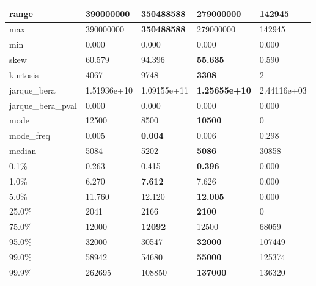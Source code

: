 \begin{table}[H]
\begin{tabular}{|l|m{10em}|m{10em}|m{10em}|m{10em}|}
\hline range & 390000000 & \bfseries 350488588 & 279000000 & \cellcolor[rgb]{0.9, 0.54, 0.52} 142945 \\
\hline max & 390000000 & \bfseries 350488588 & 279000000 & \cellcolor[rgb]{0.9, 0.54, 0.52} 142945 \\
\hline min & 0.000 & 0.000 & 0.000 & 0.000 \\
\hline skew & 60.579 & 94.396 & \bfseries 55.635 & \cellcolor[rgb]{0.9, 0.54, 0.52} 0.590 \\
\hline kurtosis & 4067 & \cellcolor[rgb]{0.9, 0.54, 0.52} 9748 & \bfseries 3308 & 2 \\
\hline jarque\_bera & 1.51936e+10 & \cellcolor[rgb]{0.9, 0.54, 0.52} 1.09155e+11 & \bfseries 1.25655e+10 & 2.44116e+03 \\
\hline jarque\_bera\_pval & 0.000 & 0.000 & 0.000 & 0.000 \\
\hline mode & 12500 & 8500 & \bfseries 10500 & \cellcolor[rgb]{0.9, 0.54, 0.52} 0 \\
\hline mode\_freq & 0.005 & \bfseries 0.004 & 0.006 & \cellcolor[rgb]{0.9, 0.54, 0.52} 0.298 \\
\hline median & 5084 & 5202 & \bfseries 5086 & \cellcolor[rgb]{0.9, 0.54, 0.52} 30858 \\
\hline 0.1\% & 0.263 & 0.415 & \bfseries 0.396 & \cellcolor[rgb]{0.9, 0.54, 0.52} 0.000 \\
\hline 1.0\% & 6.270 & \bfseries 7.612 & 7.626 & \cellcolor[rgb]{0.9, 0.54, 0.52} 0.000 \\
\hline 5.0\% & 11.760 & 12.120 & \bfseries 12.005 & \cellcolor[rgb]{0.9, 0.54, 0.52} 0.000 \\
\hline 25.0\% & 2041 & 2166 & \bfseries 2100 & \cellcolor[rgb]{0.9, 0.54, 0.52} 0 \\
\hline 75.0\% & 12000 & \bfseries 12092 & 12500 & \cellcolor[rgb]{0.9, 0.54, 0.52} 68059 \\
\hline 95.0\% & 32000 & 30547 & \bfseries 32000 & \cellcolor[rgb]{0.9, 0.54, 0.52} 107449 \\
\hline 99.0\% & 58942 & 54680 & \bfseries 55000 & \cellcolor[rgb]{0.9, 0.54, 0.52} 125374 \\
\hline 99.9\% & 262695 & \cellcolor[rgb]{0.9, 0.54, 0.52} 108850 & \bfseries 137000 & 136320 \\
\hline
\end{tabular}
\end{table}
